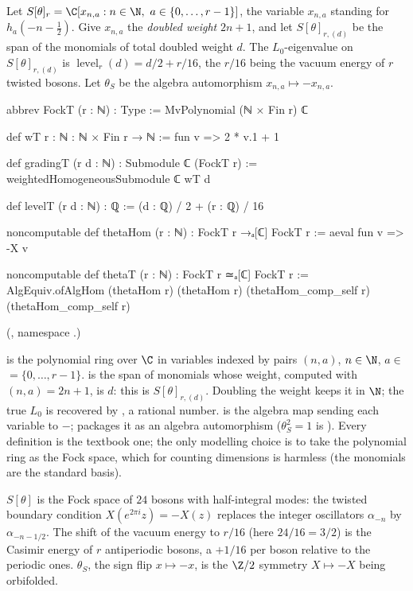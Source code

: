 \begin{definition}\label{ch05:def:fockT}
Let $S[\theta]_r = \C[x_{n,a} : n\in\N,\ a\in\{0,\dots,r-1\}]$, the variable $x_{n,a}$ standing for
$h_a(-n-\tfrac12)$. Give $x_{n,a}$ the \emph{doubled weight} $2n+1$, and let $S[\theta]_{r,(d)}$ be the
span of the monomials of total doubled weight $d$. The $L_0$-eigenvalue on $S[\theta]_{r,(d)}$ is
$\operatorname{level}_r(d) = d/2 + r/16$, the $r/16$ being the vacuum energy of $r$ twisted bosons.
Let $\theta_S$ be the algebra automorphism $x_{n,a}\mapsto -x_{n,a}$.
\end{definition}
\begin{leancode}
abbrev FockT (r : ℕ) : Type := MvPolynomial (ℕ × Fin r) ℂ

def wT {r : ℕ} : ℕ × Fin r → ℕ := fun v => 2 * v.1 + 1

def gradingT (r d : ℕ) : Submodule ℂ (FockT r) := weightedHomogeneousSubmodule ℂ wT d

def levelT (r d : ℕ) : ℚ := (d : ℚ) / 2 + (r : ℚ) / 16

noncomputable def thetaHom (r : ℕ) : FockT r →ₐ[ℂ] FockT r := aeval fun v => -X v

noncomputable def thetaT (r : ℕ) : FockT r ≃ₐ[ℂ] FockT r :=
  AlgEquiv.ofAlgHom (thetaHom r) (thetaHom r) (thetaHom_comp_self r) (thetaHom_comp_self r)
\end{leancode}
(, namespace .)
\begin{dictionary}
 is the polynomial ring over $\C$ in variables indexed by pairs $(n,a)$,
$n\in\N$, $a\in$  $=\{0,\dots,r-1\}$.  is the span
of monomials whose weight, computed with $(n,a) = 2n+1$, is $d$: this is $S[\theta]_{r,(d)}$.
Doubling the weight keeps it in $\N$; the true $L_0$ is recovered by , a rational number.
 is the algebra map sending each variable  to $-$;
 packages it as an algebra automorphism ($\theta_S^2 = 1$ is ).
Every definition is the textbook one; the only modelling choice is to take the polynomial ring as
the Fock space, which for counting dimensions is harmless (the monomials are the standard basis).
\end{dictionary}

\begin{physics}
$S[\theta]$ is the Fock space of $24$ bosons with half-integral modes: the twisted boundary condition $X(e^{2\pi i}z)=-X(z)$ replaces the integer oscillators $\alpha_{-n}$ by $\alpha_{-n-1/2}$. The shift of the vacuum energy to $r/16$ (here $24/16=3/2$) is the Casimir energy of $r$ antiperiodic bosons, a $+1/16$ per boson relative to the periodic ones. $\theta_S$, the sign flip $x\mapsto-x$, is the $\Z/2$ symmetry $X\mapsto-X$ being orbifolded.
\end{physics}

